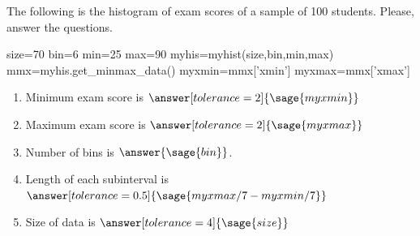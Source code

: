 \documentclass{ximera}
\begin{document}
\begin{problem}
The following is the histogram of exam scores of a sample of 100 students. Please, answer the questions.

\begin{sagesilent}
size=70
bin=6
min=25
max=90
myhis=myhist(size,bin,min,max)
mmx=myhis.get_minmax_data()
myxmin=mmx['xmin']    
myxmax=mmx['xmax']    
\end{sagesilent}


\begin{enumerate}
    \item Minimum exam score is $\answer[tolerance=2]{\sage{myxmin}}$
    \item Maximum exam score is $\answer[tolerance=2]{\sage{myxmax}}$
    \item Number of bins is $\answer{\sage{bin}}$.
    \item Length of each subinterval is $\answer[tolerance=0.5]{\sage{myxmax/7-myxmin/7}}$
    \item Size of data is $\answer[tolerance=4]{\sage{size}}$
\end{enumerate}
\end{problem}
\end{document}
